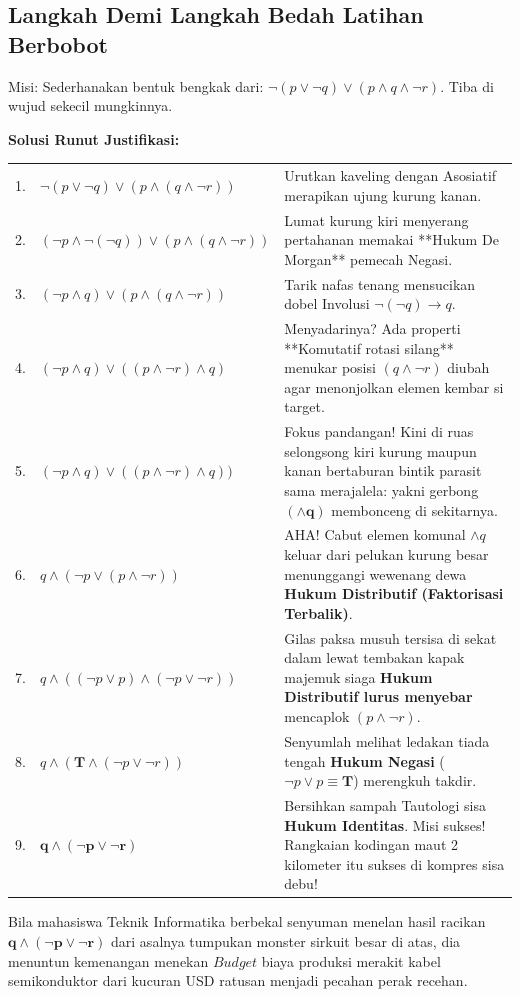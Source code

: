 \subsection{Langkah Demi Langkah Bedah Latihan Berbobot}

\begin{contoh}
Misi: Sederhanakan bentuk bengkak dari: $\neg(p \vee \neg q) \vee (p \wedge q \wedge \neg r)$.  Tiba di wujud sekecil mungkinnya.

\textbf{Solusi Runut Justifikasi:}
\vspace{2mm}
    
\begin{tabular}{p{0.4cm} p{6.2cm} p{6.5cm}}
    1. & $\neg(p \vee \neg q) \vee (p \wedge (q \wedge \neg r))$ & Urutkan kaveling dengan Asosiatif merapikan ujung kurung kanan. \\ 
    2. & $(\neg p \wedge \neg(\neg q)) \vee (p \wedge (q \wedge \neg r))$ & Lumat kurung kiri menyerang pertahanan memakai **Hukum De Morgan** pemecah Negasi. \\ 
    3. & $(\neg p \wedge q) \vee (p \wedge (q \wedge \neg r))$ & Tarik nafas tenang mensucikan dobel Involusi $\neg(\neg q) \rightarrow q$. \\ 
    4. & $(\neg p \wedge q) \vee ((p \wedge \neg r) \wedge q)$ & Menyadarinya? Ada properti **Komutatif rotasi silang** menukar posisi $(q \wedge \neg r)$ diubah agar menonjolkan elemen kembar si target. \\ 
    5. & $(\neg p \wedge q) \vee ( (p \wedge \neg r) \wedge q) )$ & Fokus pandangan! Kini di ruas selongsong kiri kurung maupun kanan bertaburan bintik parasit sama merajalela: yakni gerbong $\mathbf{(\wedge q)}$ membonceng di sekitarnya. \\
    6. & $q \wedge ( \neg p \vee (p \wedge \neg r) )$ & AHA! Cabut elemen komunal $\wedge q$ keluar dari pelukan kurung besar menunggangi wewenang dewa \textbf{Hukum Distributif (Faktorisasi Terbalik)}. \\ 
    7. & $q \wedge ( (\neg p \vee p) \wedge (\neg p \vee \neg r) )$ & Gilas paksa musuh tersisa di sekat dalam lewat tembakan kapak majemuk siaga \textbf{Hukum Distributif lurus menyebar} mencaplok $(p \wedge \neg r)$. \\
    8. & $q \wedge ( \mathbf{T} \wedge (\neg p \vee \neg r) )$ & Senyumlah melihat ledakan tiada tengah \textbf{Hukum Negasi} ($\neg p \vee p \equiv \mathbf{T}$) merengkuh takdir. \\
    9. & $\mathbf{q \wedge (\neg p \vee \neg r)}$ & Bersihkan sampah Tautologi sisa \textbf{Hukum Identitas}. Misi sukses! Rangkaian kodingan maut 2 kilometer itu sukses di kompres sisa debu!
\end{tabular} 
\vspace{2mm}

Bila mahasiswa Teknik Informatika berbekal senyuman menelan hasil racikan $\mathbf{q \wedge (\neg p \vee \neg r)}$ dari asalnya tumpukan monster sirkuit besar di atas, dia menuntun kemenangan menekan $Budget$ biaya produksi merakit kabel semikonduktor dari kucuran USD ratusan menjadi pecahan perak recehan.
\end{contoh}
